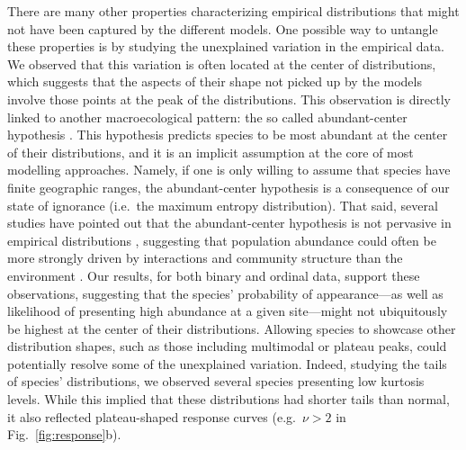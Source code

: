 \documentclass[11pt, a4paper]{article}
\begin{document}
There are many other properties characterizing empirical distributions that might not have been captured by the different models. One possible way to untangle these properties is by studying the unexplained variation in the empirical data. We observed that this variation is often located at the center of distributions, which suggests that the aspects of their shape not picked up by the models involve those points at the peak of the distributions. This observation is directly linked to another macroecological pattern: the so called abundant-center hypothesis \citep{sagarinAbundantCentreDistribution2002}. This hypothesis predicts species to be most abundant at the center of their distributions, and it is an implicit assumption at the core of most modelling approaches. Namely, if one is only willing to assume that species have finite geographic ranges, the abundant-center hypothesis is a consequence of our state of ignorance (i.e.~the maximum entropy distribution). That said, several studies have pointed out that the abundant-center hypothesis is not pervasive in empirical distributions \citep{wagnerSimilarPerformanceCentral2011, pirononGeographicVariationGenetic2017, dallasSpeciesAreNot2017}, suggesting that population abundance could often be more strongly driven by interactions and community structure than the environment \citep{dallasSpeciesAreNot2017}. Our results, for both binary and ordinal data, support these observations, suggesting that the species' probability of appearance---as well as likelihood of presenting high abundance at a given site---might not ubiquitously be highest at the center of their distributions. Allowing species to showcase other distribution shapes, such as those including multimodal or plateau peaks, could potentially resolve some of the unexplained variation. Indeed, studying the tails of species' distributions, we observed several species presenting low kurtosis levels. While this implied that these distributions had shorter tails than normal, it also reflected plateau-shaped response curves (e.g.~$\nu>2$ in Fig.~\ref{fig:response}b).
\end{document}

